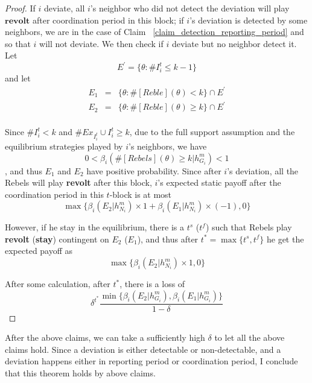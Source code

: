 \documentclass[12pt,letter]{article}
\theoremstyle{definition}
\theoremstyle{remark}
\theoremstyle{claim}
\begin{document}
\begin{proof}


If $i$ deviate, all $i$'s neighbor who did not detect the deviation will play $\textbf{revolt}$ after coordination period in this block; if $i$'s deviation is detected by some neighbors, we are in the case of Claim ~\ref{claim_detection_reporting_period} and so that $i$ will not deviate. We then check if $i$ deviate but no neighbor detect it.
Let 
\[E^{'}=\{\theta:\#I^{t}_i\leq k-1\}\]
and let 
\begin{eqnarray*}
E_1&=&\{\theta: \#[Reble](\theta)<k\}\cap E^{'}\\
E_2&=&\{\theta: \#[Reble](\theta)\geq k\}\cap E^{'}\\
\end{eqnarray*}

Since $\# I^t_i<k$ and $\# Ex_{I^{t}_i}\cup I^{t}_i \geq k$, due to the full support assumption and the equilibrium strategies played by $i$'s neighbors, we have 
\[0<\beta_{i}(\#[Rebels](\theta)\geq k|h^{m}_{G_i})<1\], and thus $E_1$ and $E_2$ have positive probability. Since after $i$'s deviation, all the Rebels will play \textbf{revolt} after this block, $i$'s expected static payoff after the coordination period in this $t$-block is at most 
\[
{\max\{\beta_{i}(E_2|h^{m}_{N_i})\times 1+\beta_{i}(E_1|h^{m}_{N_i})\times (-1), 0\}}
\]

However, if he stay in the equilibrium, there is a $t^s$ ($t^f$) such that Rebels play \textbf{revolt} (\textbf{stay}) contingent on $E_2$ ($E_1$), and thus after $t^*=\max\{t^s,t^f\}$ he get the expected payoff as
\[
{\max\{\beta_{i}(E_2|h^{m}_{N_i})\times 1, 0\}}
\]

After some calculation, after $t^*$, there is a loss of
\[\delta^{t^{*}}\frac{\min\{\beta_{i}(E_2|h^{m}_{G_i}),\beta_{i}(E_1|h^{m}_{G_i})\}}{1-\delta}\]

\end{proof}

After the above claims, we can take a sufficiently high $\delta$ to let all the above claims hold. Since a deviation is either detectable or non-detectable, and a deviation happens either in reporting period or coordination period, I conclude that this theorem holds by above claims. 
\end{document}
